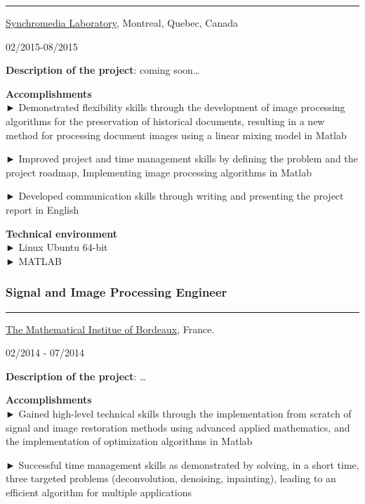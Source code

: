 \documentclass[
]{article}
\begin{document}
\begin{center}\rule{0.5\linewidth}{\linethickness}\end{center}

\href{http://www.synchromedia.ca/}{Synchromedia Laboratory}, Montreal,
Quebec, Canada

02/2015-08/2015

\textbf{Description of the project}: coming soon\ldots{}

\textbf{Accomplishments}\\
► Demonstrated flexibility skills through the development of image
processing algorithms for the preservation of historical documents,
resulting in a new method for processing document images using a linear
mixing model in Matlab

► Improved project and time management skills by defining the problem
and the project roadmap, Implementing image processing algorithms in
Matlab

► Developed communication skills through writing and presenting the
project report in English

\textbf{Technical environment}\\
► Linux Ubuntu 64-bit\\
► MATLAB

\hypertarget{signal-and-image-processing-engineer}{%
\subsubsection{Signal and Image Processing
Engineer}\label{signal-and-image-processing-engineer}}

\begin{center}\rule{0.5\linewidth}{\linethickness}\end{center}

\href{https://www.math.u-bordeaux.fr/imb/spip.php}{The Mathematical
Institue of Bordeaux}, France.

02/2014 - 07/2014

\textbf{Description of the project}: \ldots{}

\textbf{Accomplishments}\\
► Gained high-level technical skills through the implementation from
scratch of signal and image restoration methods using advanced applied
mathematics, and the implementation of optimization algorithms in Matlab

► Successful time management skills as demonstrated by solving, in a
short time, three targeted problems (deconvolution, denoising,
inpainting), leading to an efficient algorithm for multiple applications
\end{document}
